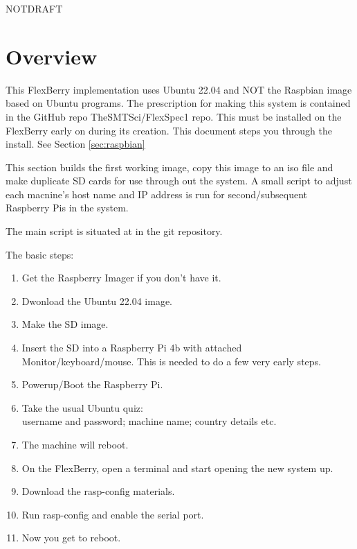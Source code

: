 \documentclass[letter,11pt,oneside]{article}
\def\documentisdraft{NOTDRAFT}
\newcommand{\dhl}[1]{{\color{verbcolor}{\texttt#1}}}
\begin{document}
\clearpage
{}   %
\tableofcontents
\listoffigures
\listoftables
\newpage


\setcounter{section}{1}

\ifx\documentisdraft\drafttest
\linenumbers    %
\fi
{}

\section*{Overview}
\setcounter{page}{1}

This FlexBerry implementation uses Ubuntu 22.04 and NOT the Raspbian
image based on Ubuntu programs. The prescription for making this
system is contained in the GitHub repo TheSMTSci/FlexSpec1 repo. This
must be installed on the FlexBerry early on during its creation. This
document steps you through the install. See Section \ref{sec:raspbian}

This section builds the first working image, copy this image to an
iso file and make duplicate SD cards for use through out the system.
A small script to adjust each macnine's host name and IP address is
run for second/subsequent Raspberry Pis in the system.

The main script is situated at \dhl{\$HOME/git/FlexSpec1/code/HOME/FollowMe.sh}
in the git repository.

The basic steps:
\vspace{-.15cm}
\begin{enumerate}\addtolength{\itemsep}{-0.5\baselineskip}
   \item   Get the Raspberry Imager if you don't have it.
   \item   Dwonload the Ubuntu 22.04 image.
   \item   Make the SD image.
   \item   Insert the SD into a Raspberry Pi 4b with attached Monitor/keyboard/mouse.
  This is needed to do a few very early steps.
   \item   Powerup/Boot the Raspberry Pi.
   \item   Take the usual Ubuntu quiz:\\
        username and password; machine name; country details etc.
   \item   The machine will reboot.
   \item   On the FlexBerry, open a terminal and start opening the new system up.
   \item   Download the rasp-config materials.
   \item   Run rasp-config and enable the serial port.
   \item   Now you get to reboot.
\end{enumerate}
\end{document}
